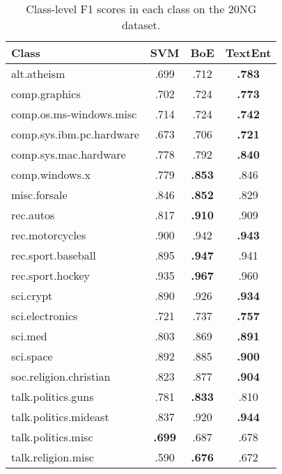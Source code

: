 \documentclass[11pt]{article}
\begin{document}
  \begin{table}[t]
    \centering
    \setlength\tabcolsep{6pt}
    \begin{tabular}{l|ccc}
      Class & SVM & BoE & TextEnt \\
      \hline
      alt.atheism              &         .699  &         .712  & \textbf{.783} \\
      comp.graphics            &         .702  &         .724  & \textbf{.773} \\
      comp.os.ms-windows.misc  &         .714  &         .724  & \textbf{.742} \\
      comp.sys.ibm.pc.hardware &         .673  &         .706  & \textbf{.721} \\
      comp.sys.mac.hardware    &         .778  &         .792  & \textbf{.840} \\
      comp.windows.x           &         .779  & \textbf{.853} &         .846  \\
      misc.forsale             &         .846  & \textbf{.852} &         .829  \\
      rec.autos                &         .817  & \textbf{.910} &         .909  \\
      rec.motorcycles          &         .900  &         .942  & \textbf{.943} \\
      rec.sport.baseball       &         .895  & \textbf{.947} &         .941  \\
      rec.sport.hockey         &         .935  & \textbf{.967} &         .960  \\
      sci.crypt                &         .890  &         .926  & \textbf{.934} \\
      sci.electronics          &         .721  &         .737  & \textbf{.757} \\
      sci.med                  &         .803  &         .869  & \textbf{.891} \\
      sci.space                &         .892  &         .885  & \textbf{.900} \\
      soc.religion.christian   &         .823  &         .877  & \textbf{.904} \\
      talk.politics.guns       &         .781  & \textbf{.833} &         .810  \\
      talk.politics.mideast    &         .837  &         .920  & \textbf{.944} \\
      talk.politics.misc       & \textbf{.699} &         .687  &         .678  \\
      talk.religion.misc       &         .590  & \textbf{.676} &         .672  \\
\end{tabular}
    \caption{Class-level F1 scores in each class on the 20NG dataset.}
    \label{tb:20ng-class-level-results}
  \end{table}
\end{document}
